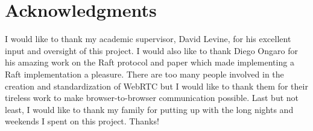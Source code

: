 \documentclass[conference,compsoc]{./IEEEtran/IEEEtran}
\begin{document}
\section*{Acknowledgments}

I would like to thank my academic supervisor, David Levine, for his excellent input and oversight of this project. I would also like to thank Diego Ongaro for his amazing work on the Raft protocol and paper which made implementing a Raft implementation a pleasure.  There are too many people involved in the creation and standardization of WebRTC but I would like to thank them for their tireless work to make browser-to-browser communication possible. Last but not least, I would like to thank my family for putting up with the long nights and weekends I spent on this project. Thanks!



\end{document}
